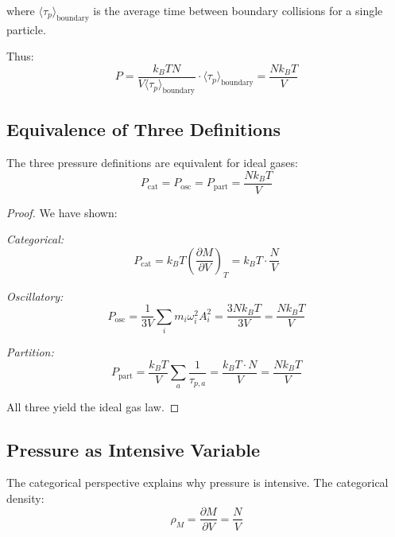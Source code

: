 where $\langle\tau_p\rangle_{\text{boundary}}$ is the average time between boundary collisions for a single particle.

Thus:
\begin{equation}
P = \frac{k_B T N}{V \langle\tau_p\rangle_{\text{boundary}}} \cdot \langle\tau_p\rangle_{\text{boundary}} = \frac{Nk_B T}{V}
\end{equation}

\subsection{Equivalence of Three Definitions}

\begin{theorem}
\label{thm:pressure_equivalence}
The three pressure definitions are equivalent for ideal gases:
\begin{equation}
P_{\text{cat}} = P_{\text{osc}} = P_{\text{part}} = \frac{Nk_B T}{V}
\end{equation}
\end{theorem}

\begin{proof}
We have shown:

\textit{Categorical:}
\begin{equation}
P_{\text{cat}} = k_B T \left(\frac{\partial M}{\partial V}\right)_T = k_B T \cdot \frac{N}{V}
\end{equation}

\textit{Oscillatory:}
\begin{equation}
P_{\text{osc}} = \frac{1}{3V}\sum_i m_i \omega_i^2 A_i^2 = \frac{3Nk_B T}{3V} = \frac{N k_B T}{V}
\end{equation}

\textit{Partition:}
\begin{equation}
P_{\text{part}} = \frac{k_B T}{V} \sum_a \frac{1}{\tau_{p,a}} = \frac{k_B T \cdot N}{V} = \frac{N k_B T}{V}
\end{equation}

All three yield the ideal gas law.
\end{proof}

\subsection{Pressure as Intensive Variable}

The categorical perspective explains why pressure is intensive. The categorical density:
\begin{equation}
\rho_M = \frac{\partial M}{\partial V} = \frac{N}{V}
\end{equation}

